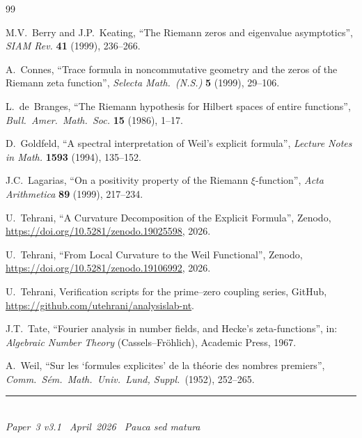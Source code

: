 \documentclass[11pt]{article}
\begin{document}

\newpage
\begin{thebibliography}{99}

M.V.~Berry and J.P.~Keating,
``The Riemann zeros and eigenvalue asymptotics'',
\emph{SIAM Rev.} \textbf{41} (1999), 236--266.

A.~Connes,
``Trace formula in noncommutative geometry and the zeros of the Riemann
zeta function'',
\emph{Selecta Math.\ (N.S.)} \textbf{5} (1999), 29--106.

L.~de~Branges,
``The Riemann hypothesis for Hilbert spaces of entire functions'',
\emph{Bull.\ Amer.\ Math.\ Soc.} \textbf{15} (1986), 1--17.

D.~Goldfeld,
``A spectral interpretation of Weil's explicit formula'',
\emph{Lecture Notes in Math.} \textbf{1593} (1994), 135--152.

J.C.~Lagarias,
``On a positivity property of the Riemann $\xi$-function'',
\emph{Acta Arithmetica} \textbf{89} (1999), 217--234.

U.~Tehrani,
``A Curvature Decomposition of the Explicit Formula'',
Zenodo, \url{https://doi.org/10.5281/zenodo.19025598}, 2026.

U.~Tehrani,
``From Local Curvature to the Weil Functional'',
Zenodo, \url{https://doi.org/10.5281/zenodo.19106992}, 2026.

U.~Tehrani,
Verification scripts for the prime--zero coupling series,
GitHub, \url{https://github.com/utehrani/analysislab-nt}.

J.T.~Tate,
``Fourier analysis in number fields, and Hecke's zeta-functions'',
in: \emph{Algebraic Number Theory} (Cassels--Fr\"ohlich),
Academic Press, 1967.

A.~Weil,
``Sur les `formules explicites' de la th\'eorie des nombres premiers'',
\emph{Comm.\ S\'em.\ Math.\ Univ.\ Lund, Suppl.}\ (1952), 252--265.

\end{thebibliography}


\enlargethispage{3\baselineskip}
\vspace*{\fill}
\begin{minipage}{\linewidth}
\rule{\linewidth}{0.4pt}\smallskip\\
\small\emph{Paper~3 v3.1 \textperiodcentered\ April~2026
\textperiodcentered\ Pauca sed matura}
\end{minipage}
\end{document}
